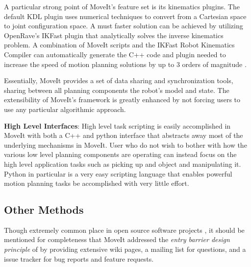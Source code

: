 \documentclass[10pt,journal,compsoc]{joser1}
\begin{document}
{A particular strong point of MoveIt's feature set is its kinematics plugins. The default KDL plugin uses numerical techniques to convert from a Cartesian space to joint configuration space. A must faster solution can be achieved by utilizing OpenRave's IKFast \cite{ikfast} plugin that analytically solves the inverse kinematics problem. A combination of MoveIt scripts and the IKFast Robot Kinematics Compiler can automatically generate the C++ code and plugin needed to increase the speed of motion planning solutions by up to 3 orders of magnitude \cite{ikfast}.

Essentially, MoveIt provides a set of data sharing and synchronization tools, sharing between all planning components the robot's model and state. The extensibility of MoveIt's framework is greatly enhanced by not forcing users to use any particular algorithmic approach. 

{\bf High Level Interfaces}: High level task scripting is easily accomplished in MoveIt with both a C++ and python interface that abstracts away most of the underlying mechanisms in MoveIt. User who do not wish to bother with how the various low level planning components are operating can instead focus on the high level application tasks such as picking up and object and manipulating it. Python in particular is a very easy scripting language that enables powerful motion planning tasks be accomplished with very little effort.

\subsection{Other Methods}

Though extremely common place in open source software projects \cite{bruyninckx2001open}, it should be mentioned for completeness that MoveIt addressed the \textit{entry barrier design principle} of  by providing extensive wiki pages, a mailing list for questions, and a issue tracker for bug reports and feature requests.

}
\end{document}

